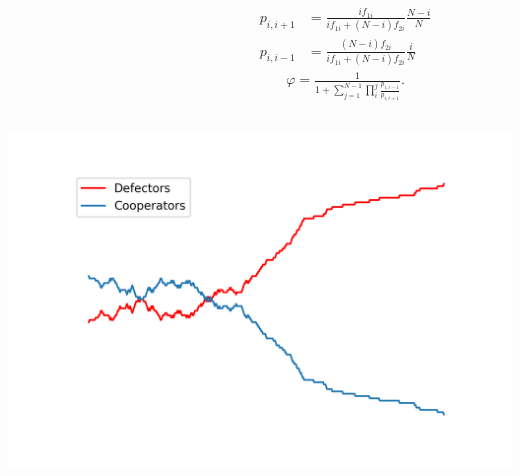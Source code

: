 \documentclass{beamer}
\begin{document}
\begin{frame}
    \begin{columns}
        \begin{column}{.5\textwidth}
            
        \end{column}
        \begin{column}{.5\textwidth}
            \pause\begin{align*}
                p_{i, i + 1} & = \frac{i f_{1i}} {i f_{1i} + (N - i) f_{2i}} \frac{N - i}{N}\\
                p_{i, i - 1} & = \frac{(N - i) f_{2i}} {i f_{1i} + (N - i) f_{2i}} \frac{i}{N}
            \end{align*}
            \begin{align*}
                \varphi = \frac{1}{1+\sum_{j=1}^{N-1}\prod_i^j \frac{p_{i, i - 1}}{p_{i, i + 1}}}.
            \end{align*}
        \end{column}
    \end{columns}
\end{frame}

\begin{frame}
    \centering
    \includegraphics[width=.75\textwidth]{static/moran_results.png}
\end{frame}
\end{document}
